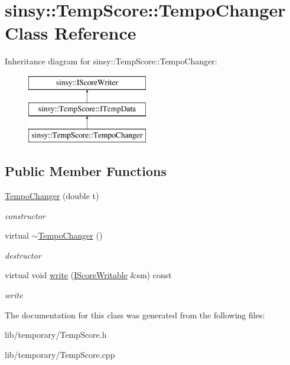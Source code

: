 \hypertarget{classsinsy_1_1TempScore_1_1TempoChanger}{\section{sinsy\-:\-:\-Temp\-Score\-:\-:\-Tempo\-Changer \-Class \-Reference}
\label{classsinsy_1_1TempScore_1_1TempoChanger}
}
\-Inheritance diagram for sinsy\-:\-:\-Temp\-Score\-:\-:\-Tempo\-Changer\-:\begin{figure}[H]
\begin{center}
\leavevmode
\includegraphics[height=3.000000cm]{classsinsy_1_1TempScore_1_1TempoChanger}
\end{center}
\end{figure}
\subsection*{\-Public \-Member \-Functions}
\begin{DoxyCompactItemize}
\item 
\hypertarget{classsinsy_1_1TempScore_1_1TempoChanger_aca8c98879a7c5efab64f25cd36438ad8}{\hyperlink{classsinsy_1_1TempScore_1_1TempoChanger_aca8c98879a7c5efab64f25cd36438ad8}{\-Tempo\-Changer} (double t)}\label{classsinsy_1_1TempScore_1_1TempoChanger_aca8c98879a7c5efab64f25cd36438ad8}

\begin{DoxyCompactList}\small\item\em constructor \end{DoxyCompactList}\item 
\hypertarget{classsinsy_1_1TempScore_1_1TempoChanger_abd747c15eb0a900af583ac87cd895e4b}{virtual \hyperlink{classsinsy_1_1TempScore_1_1TempoChanger_abd747c15eb0a900af583ac87cd895e4b}{$\sim$\-Tempo\-Changer} ()}\label{classsinsy_1_1TempScore_1_1TempoChanger_abd747c15eb0a900af583ac87cd895e4b}

\begin{DoxyCompactList}\small\item\em destructor \end{DoxyCompactList}\item 
\hypertarget{classsinsy_1_1TempScore_1_1TempoChanger_abf1ab4899af9c7a8780a39ca0d68909e}{virtual void \hyperlink{classsinsy_1_1TempScore_1_1TempoChanger_abf1ab4899af9c7a8780a39ca0d68909e}{write} (\hyperlink{classsinsy_1_1IScoreWritable}{\-I\-Score\-Writable} \&sm) const }\label{classsinsy_1_1TempScore_1_1TempoChanger_abf1ab4899af9c7a8780a39ca0d68909e}

\begin{DoxyCompactList}\small\item\em write \end{DoxyCompactList}\end{DoxyCompactItemize}


\-The documentation for this class was generated from the following files\-:\begin{DoxyCompactItemize}
\item 
lib/temporary/\-Temp\-Score.\-h\item 
lib/temporary/\-Temp\-Score.\-cpp\end{DoxyCompactItemize}
